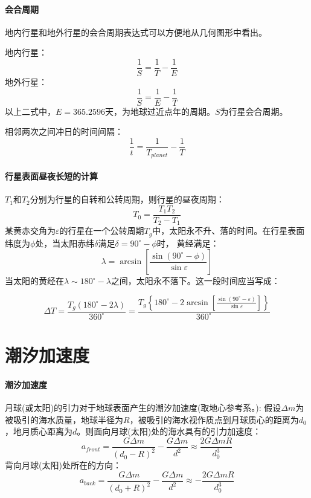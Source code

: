 \paragraph{会合周期}
地内行星和地外行星的会合周期表达式可以方便地从几何图形中看出。

地内行星：
\begin{equation}
	\frac{1}{S}=\frac{1}{T}-\frac{1}{E}
\end{equation}
地外行星：
\begin{equation}
	\frac{1}{S}=\frac{1}{E}-\frac{1}{T}
\end{equation}
以上二式中，$E=365.2596$天，为地球过近点年的周期。$S$为行星会合周期。

相邻两次之间冲日的时间间隔：
\begin{equation}
	\frac{1}{t}=\frac{1}{T_{planet}}-\frac{1}{T}
\end{equation}
\paragraph{行星表面昼夜长短的计算}
$T_{1}$和$T_{2}$分别为行星的自转和公转周期，则行星的昼夜周期：
\begin{equation}
	T_{0} = \frac{T_{1}T_{2}}{T_{2}-T_{1}}
\end{equation}
某黄赤交角为$\varepsilon$的行星在一个公转周期$T_{g}$中，太阳永不升、落的时间。在行星表面纬度为$\phi$处，当太阳赤纬$\delta$满足$\delta = 90^\circ -\phi$时，
黄经满足：
\begin{equation}
	\lambda =\arcsin \left[\frac{\sin(90^\circ-\phi)}{\sin \varepsilon}\right]
\end{equation}
当太阳的黄经在$\lambda \sim 180^\circ -\lambda$之间，太阳永不落下。这一段时间应当写成：

\begin{equation}
	\Delta T = \frac{T_{g}(180^\circ-2\lambda )}{360^\circ}=\frac{T_{g}\left\{180^\circ-2\arcsin \left[\frac{\sin (90^\circ -\varepsilon)}{\sin \varepsilon}\right]\right\}}{360^\circ}
\end{equation}

\section{潮汐加速度}
\paragraph{潮汐加速度}
月球(或太阳)的引力对于地球表面产生的潮汐加速度(取地心参考系。):
假设$\Delta m$为被吸引的海水质量，地球半径为$R$，被吸引的海水视作质点到月球质心的距离为$d_{0}$，地月质心距离为$d$。则面向月球(太阳)处的海水具有的引力加速度：
\begin{equation}
	a_{front}=\frac{G\Delta m}{(d_{0}-R)^2}-\frac{G\Delta m}{d^2}\approx \frac{2G\Delta mR}{d_{0}^3}
\end{equation}
背向月球(太阳)处所在的方向：
\begin{equation}
	a_{back}=\frac{G\Delta m}{(d_{0}+R)^2}-\frac{G\Delta m}{d^2}\approx -\frac{2G\Delta mR}{d_{0}^3}
\end{equation}

